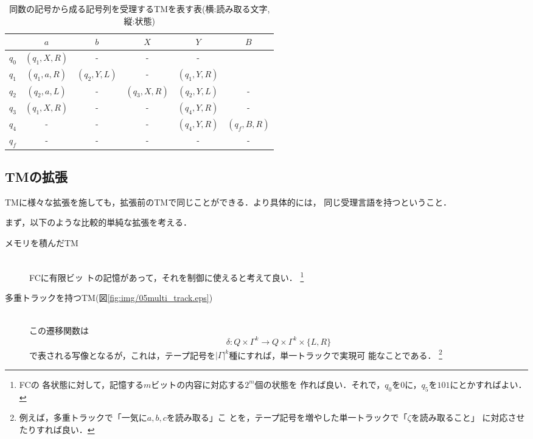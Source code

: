 \begin{table}
 \caption{同数の記号から成る記号列を受理するTMを表す表(横:読み取る文字,
 縦:状態)}
 \begin{center}
  \begin{tabular}{c|c|c|c|c|c}
   \hline
    & $a$ & $b$ & $X$ & $Y$ & $B$ \\
    \hline \hline
   $q_0$ & $(q_1, X, R)$& - & - & - &\\ \hline
   $q_1$ & $(q_1, a, R)$ & $(q_2, Y, L)$ & - & $(q_1, Y, R)$ \\ \hline
   $q_2$ & $(q_2, a, L)$ & - & $(q_3, X, R)$ & $(q_2, Y, L)$ & - \\ \hline
   $q_3$ & $(q_1, X, R)$ & - & - & $(q_4, Y, R)$ & - \\ \hline
   $q_4$ & - & - & - & $(q_4, Y, R)$ & $(q_f, B, R)$ \\ \hline
   $q_f$ & - & - & - & - & -  \\ \hline
  \end{tabular}
  \label{tb:05ab}
 \end{center}
\end{table}

\subsection{TMの拡張}
TMに様々な拡張を施しても，拡張前のTMで同じことができる．より具体的には，
同じ受理言語を持つということ．

まず，以下のような比較的単純な拡張を考える．


\begin{description}
 \item [メモリを積んだTM] \mbox{} \\
             FCに有限ビッ
             トの記憶があって，それを制御に使えると考えて良い． \footnote{FCの
             各状態に対して，記憶する$m$ビットの内容に対応する$2^m$個の状態を
             作れば良い．それで，$q_0$を$0$に，$q_5$を$101$にとかすればよい．}
 \item [多重トラックを持つTM(図\ref{fig:img/05multi_track.eps})] \mbox{} \\
             この遷移関数は
             \[
             \delta : Q \times \Gamma^k \rightarrow Q \times \Gamma^k \times
             \{L, R\}
             \]
             で表される写像となるが，これは，テープ記号を$|\Gamma|^k$種にすれば，単一トラックで実現可
             能なことである． \footnote{例えば，多重トラックで「一気に$a,b,c$を読み取る」こ
             とを，テープ記号を増やした単一トラックで「$\zeta$を読み取ること」
             に対応させたりすれば良い．}
\end{description}


